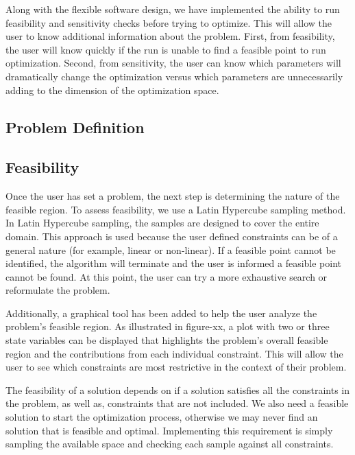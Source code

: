 \documentclass[10pt]{article}
\begin{document}
Along with the flexible software design, we have implemented the ability to run feasibility and sensitivity checks before trying to optimize. This will allow the user to know additional information about the problem. First, from feasibility, the user will know quickly if the run is unable to find a feasible point to run optimization. Second, from sensitivity, the user can know which parameters will dramatically change the optimization versus which parameters are unnecessarily adding to the dimension of the optimization space. 

\subsection{Problem Definition}
\label{sec:Problem Definition}


\subsection{Feasibility}
\label{sec:Feasibility}

Once the user has set a problem, the next step is determining the nature of the feasible region.  To assess feasibility, we use a Latin Hypercube sampling method.  In Latin Hypercube sampling, the samples are designed to cover the entire domain.  This approach is used because the user defined constraints can be of a general nature (for example, linear or non-linear).  If a feasible point cannot be identified, the algorithm will terminate and the user is informed a feasible point cannot be found.  At this point, the user can try a more exhaustive search or reformulate the problem.

Additionally, a graphical tool has been added to help the user analyze the problem's feasible region.  As illustrated in figure-xx, a plot with two or three state variables can be displayed that highlights the problem's overall feasible region and the contributions from each individual constraint.  This will allow the user to see which constraints are most restrictive in the context of their problem.


The feasibility of a solution depends on if a solution satisfies all the constraints in the problem, as well as, constraints that are not included. We also need a feasible solution to start the optimization process, otherwise we may never find an solution that is feasible and optimal. Implementing this requirement is simply sampling the available space and checking each sample against all constraints. 
\end{document}
